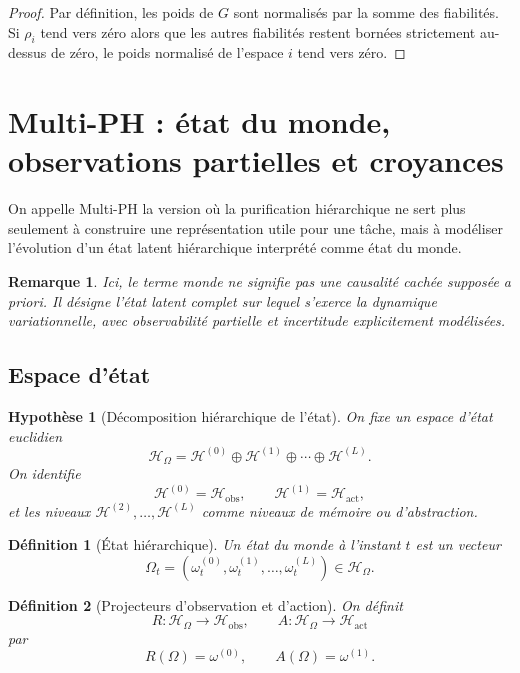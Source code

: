 \documentclass[11pt,a4paper]{article}
\newtheorem{definition}{Définition}[section]
\newtheorem{assumption}{Hypothèse}[section]
\newtheorem{remark}{Remarque}[section]
\newcommand{\Hh}{\mathcal H}
\newcommand{\1}{\mathbf 1}
\begin{document}
\begin{proof}
Par définition, les poids de \(G\) sont normalisés par la somme des fiabilités.  
Si \(\rho_i\) tend vers zéro alors que les autres fiabilités restent bornées strictement au-dessus de zéro, le poids normalisé de l'espace \(i\) tend vers zéro.
\end{proof}

\section{Multi-PH : état du monde, observations partielles et croyances}

On appelle Multi-PH la version où la purification hiérarchique ne sert plus seulement à construire une représentation utile pour une tâche, mais à modéliser l'évolution d'un état latent hiérarchique interprété comme état du monde.

\begin{remark}
Ici, le terme \emph{monde} ne signifie pas une causalité cachée supposée a priori.  
Il désigne l'état latent complet sur lequel s'exerce la dynamique variationnelle, avec observabilité partielle et incertitude explicitement modélisées.
\end{remark}

\subsection{Espace d'état}

\begin{assumption}[Décomposition hiérarchique de l'état]
On fixe un espace d'état euclidien
\[
\Hh_\Omega=\Hh^{(0)}\oplus\Hh^{(1)}\oplus\cdots\oplus\Hh^{(L)}.
\]
On identifie
\[
\Hh^{(0)}=\Hh_{\mathrm{obs}},
\qquad
\Hh^{(1)}=\Hh_{\mathrm{act}},
\]
et les niveaux \(\Hh^{(2)},\dots,\Hh^{(L)}\) comme niveaux de mémoire ou d'abstraction.
\end{assumption}

\begin{definition}[État hiérarchique]
Un état du monde à l'instant \(t\) est un vecteur
\[
\Omega_t=(\omega_t^{(0)},\omega_t^{(1)},\dots,\omega_t^{(L)})\in\Hh_\Omega.
\]
\end{definition}

\begin{definition}[Projecteurs d'observation et d'action]
On définit
\[
R:\Hh_\Omega\to\Hh_{\mathrm{obs}},
\qquad
A:\Hh_\Omega\to\Hh_{\mathrm{act}}
\]
par
\[
R(\Omega)=\omega^{(0)},
\qquad
A(\Omega)=\omega^{(1)}.
\]
\end{definition}
\end{document}

